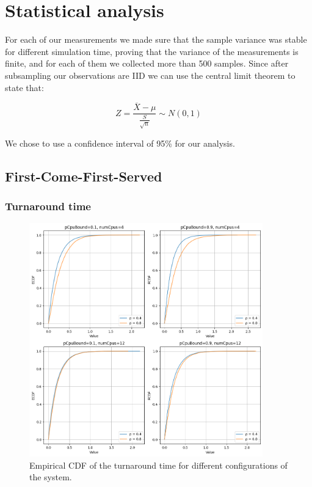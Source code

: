 \section{Statistical analysis}

For each of our measurements we made sure that the sample variance was stable for different simulation time, proving that the variance of the measurements is finite, and for each of them we collected more than 500 samples. Since after subsampling our observations are IID we can use the central limit theorem to state that:


\begin{equation}
    Z = \frac{\overline{X} - \mu}{\frac{S}{\sqrt{n}}} \sim N(0,1)
\end{equation}

We chose to use a confidence interval of 95\% for our analysis.

\subsection{First-Come-First-Served}
\subsubsection{Turnaround time}

\begin{figure}[H]
    \captionsetup{type=figure}
    \centering
    \includegraphics[width=0.9\textwidth]{./images/04/fcfs/ecdf.png}
    \caption{Empirical CDF of the turnaround time for different configurations of the system.}
    \label{fig:fcfs_ecdf}
\end{figure}

